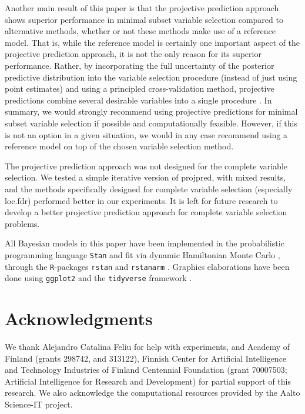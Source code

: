 \documentclass[a4]{article}
\theoremstyle{definition}
\begin{document}
Another main result of this paper is that the projective prediction
approach shows superior performance in minimal subset variable
selection compared to alternative methods, whether or not these methods
make use of a reference model. That is, while the reference model is
certainly one important aspect of the projective prediction approach, it
is not the only reason for its superior performance.  Rather, by
incorporating the full uncertainty of the posterior predictive
distribution into the variable selection procedure (instead of just
using point estimates) and using a principled cross-validation method,
projective predictions combine several desirable variables into a
single procedure \citep{paper:projpred}.  In summary, we would
strongly recommend using projective predictions for minimal subset
 variable selection if possible and computationally feasible. 
 However, if this is not an option in a given
situation, we would in any case recommend using a reference model on
top of the chosen variable selection method.

The projective prediction approach was not designed for the complete
variable selection. We tested a simple iterative version of projpred,
with mixed results, and the methods specifically designed for complete
variable selection (especially loc.fdr) performed better in our
experiments. It is left for future research to develop 
a better projective prediction approach for complete variable
selection problems.

All Bayesian models in this paper have been implemented in
the probabilistic programming language \texttt{Stan}
\citep{paper:stan} and fit via dynamic Hamiltonian Monte Carlo
\citep{hoffman2014no,betancourt2017conceptual}, through the \texttt{R}-packages 
\texttt{rstan} \citep{Rrstan} and \texttt{rstanarm} \citep{Rrstanarm}.
Graphics elaborations have been done using \texttt{ggplot2} \citep{Rggplot2}
and the \texttt{tidyverse} framework \citep{Rtidyverse}.

\section*{Acknowledgments}

We thank Alejandro Catalina Feliu for help with experiments, and
Academy of Finland (grants 298742, and 313122), Finnish Center for
Artificial Intelligence and Technology Industries of Finland
Centennial Foundation (grant 70007503; Artificial Intelligence for
Research and Development) for partial support of this research. We
also acknowledge the computational resources provided by the Aalto
Science-IT project.
 
\end{document}
